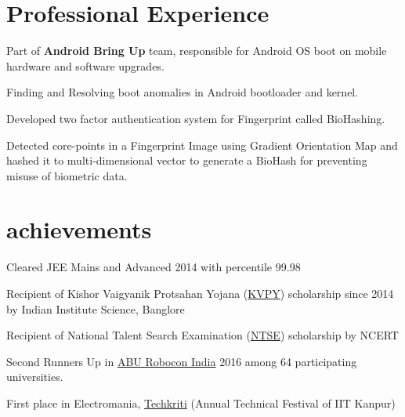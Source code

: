 \documentclass[]{deedy-resume-openfont}
\begin{document}
\begin{minipage}[t]{0.69\textwidth} 

\section{Professional Experience}
\vspace{3.5mm}
\begin{tightemize}
\item Part of \textbf{Android Bring Up} team, responsible for Android OS boot on mobile hardware and software upgrades.
\item Finding and Resolving boot anomalies in Android bootloader and kernel.
\end{tightemize}
\begin{tightemize}
\item Developed two factor authentication system for Fingerprint called BioHashing.
\item Detected core-points in a Fingerprint Image using Gradient Orientation Map and hashed it to multi-dimensional vector to generate a BioHash for preventing misuse of biometric data.
\end{tightemize} 
\section{achievements}
\vspace{2mm}
\begin{tightemize}
	\item Cleared JEE Mains and Advanced 2014 with percentile 99.98
	\item Recipient of Kishor Vaigyanik Protsahan Yojana (\href{http://www.kvpy.iisc.ernet.in/main/index.htm}{KVPY}) scholarship since 2014 by Indian Institute Science, Banglore
	\item Recipient of National Talent Search Examination (\href{http://www.ncert.nic.in/programmes/talent_exam/index_talent.html}{NTSE}) scholarship by NCERT 
	\item Second Runners Up in \href{http://www.roboconindia.com/}{ABU Robocon India} 2016 among 64 participating universities.
	\item First place in Electromania, \href{https://techkriti.org/}{Techkriti} (Annual Technical Festival of IIT Kanpur)
\end{tightemize}


\end{minipage}
\end{document}
